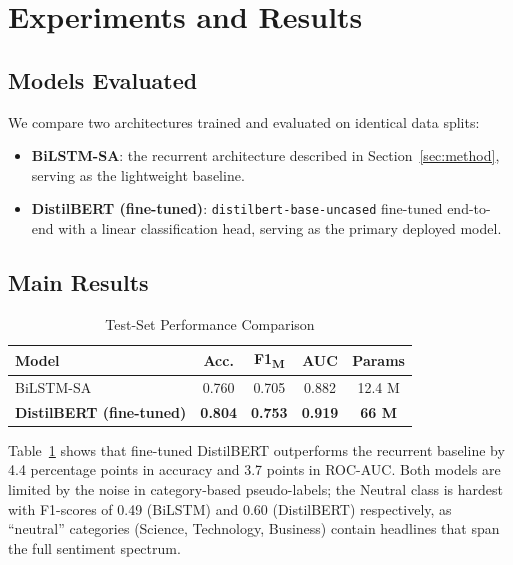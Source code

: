 \documentclass[conference]{IEEEtran}
\begin{document}
\section{Experiments and Results}
\label{sec:experiments}

\subsection{Models Evaluated}
We compare two architectures trained and evaluated on identical
data splits:

\begin{itemize}
  \item \textbf{BiLSTM-SA}: the recurrent architecture described in
        Section~\ref{sec:method}, serving as the lightweight baseline.
  \item \textbf{DistilBERT (fine-tuned)}: \texttt{distilbert-base-uncased}
        fine-tuned end-to-end with a linear classification head,
        serving as the primary deployed model.
\end{itemize}

\subsection{Main Results}

\begin{table}[h]
\caption{Test-Set Performance Comparison}
\label{tab:results}
\centering
\begin{tabular}{lcccc}
\toprule
\textbf{Model} & \textbf{Acc.} & \textbf{F1\textsubscript{M}} &
\textbf{AUC} & \textbf{Params} \\
\midrule
BiLSTM-SA       & 0.760 & 0.705 & 0.882 & 12.4 M \\
\midrule
\textbf{DistilBERT (fine-tuned)} & \textbf{0.804} & \textbf{0.753} & \textbf{0.919} & \textbf{66 M} \\
\bottomrule
\end{tabular}
\end{table}

Table~\ref{tab:results} shows that fine-tuned DistilBERT outperforms
the recurrent baseline by 4.4 percentage points in accuracy and 3.7
points in ROC-AUC. Both models are limited by the noise in
category-based pseudo-labels; the Neutral class is hardest with
F1-scores of 0.49 (BiLSTM) and 0.60 (DistilBERT) respectively,
as ``neutral'' categories (Science, Technology, Business) contain
headlines that span the full sentiment spectrum.
\end{document}
